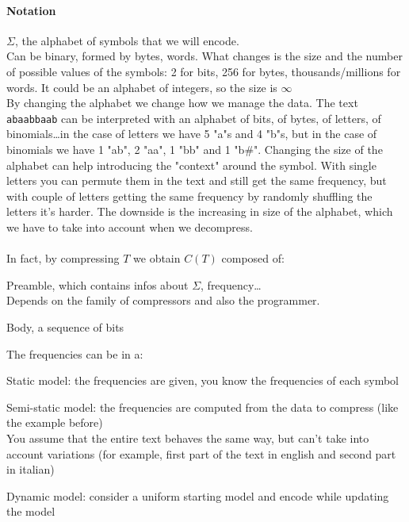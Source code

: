 \documentclass[10pt]{report}
\begin{document}
\paragraph{Notation}\begin{list}{}{}
	\item $\Sigma$, the alphabet of symbols that we will encode.\\
	Can be binary, formed by bytes, words. What changes is the size and the number of possible values of the symbols: 2 for bits, 256 for bytes, thousands/millions for words. It could be an alphabet of integers, so the size is $\infty$\\
	By changing the alphabet we change how we manage the data. The text \texttt{abaabbaab} can be interpreted with an alphabet of bits, of bytes, of letters, of binomials\ldots in the case of letters we have 5 "a"s and 4 "b"s, but in the case of binomials we have 1 "ab", 2 "aa", 1 "bb" and 1 "b\#". Changing the size of the alphabet can help introducing the "context" around the symbol. With single letters you can permute them in the text and still get the same frequency, but with couple of letters getting the same frequency by randomly shuffling the letters it's harder. The downside is the increasing in size of the alphabet, which we have to take into account when we decompress.\\\\
	In fact, by compressing $T$ we obtain $C(T)$ composed of:
	\begin{list}{}{}
		\item Preamble, which contains infos about $\Sigma$, frequency\ldots\\
		Depends on the family of compressors and also the programmer.
		\item Body, a sequence of bits
	\end{list}
	\item The frequencies can be in a:\begin{list}{}{}
		\item Static model: the frequencies are given, you know the frequencies of each symbol
		\item Semi-static model: the frequencies are computed from the data to compress (like the example before)\\
		You assume that the entire text behaves the same way, but can't take into account variations (for example, first part of the text in english and second part in italian)
		\item Dynamic model: consider a uniform starting model and encode while updating the model
	\end{list}
\end{list}
\end{document}

